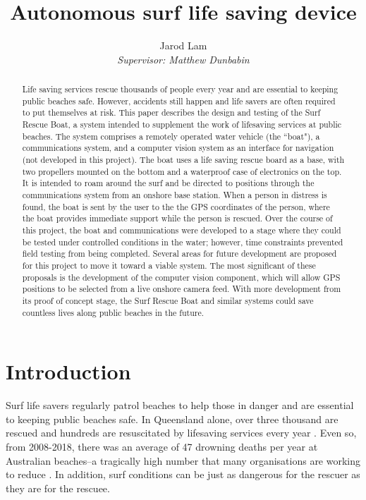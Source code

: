 \documentclass[a4paper]{IEEEtran}
\title{\vspace{5.0cm}Autonomous surf life saving device}
\author{\Large Jarod Lam\\ \textit{Supervisor: Matthew Dunbabin}}
\begin{document}
\begin{minipage}{\textwidth}
\vfill
\maketitle
\vfill
\end{minipage}
\clearpage

\begin{abstract}
Life saving services rescue thousands of people every year and are essential to keeping public beaches safe. However, accidents still happen and life savers are often required to put themselves at risk. This paper describes the design and testing of the Surf Rescue Boat, a system intended to supplement the work of lifesaving services at public beaches. The system comprises a remotely operated water vehicle (the ``boat"), a communications system, and a computer vision system as an interface for navigation (not developed in this project). The boat uses a life saving rescue board as a base, with two propellers mounted on the bottom and a waterproof case of electronics on the top. It is intended to roam around the surf and be directed to positions through the communications system from an onshore base station. When a person in distress is found, the boat is sent by the user to the the GPS coordinates of the person, where the boat provides immediate support while the person is rescued. Over the course of this project, the boat and communications were developed to a stage where they could be tested under controlled conditions in the water; however, time constraints prevented field testing from being completed. Several areas for future development are proposed for this project to move it toward a viable system. The most significant of these proposals is the development of the computer vision component, which will allow GPS positions to be selected from a live onshore camera feed. With more development from its proof of concept stage, the Surf Rescue Boat and similar systems could save countless lives along public beaches in the future.
\end{abstract}

\setcounter{tocdepth}{2}
\tableofcontents

\section{Introduction}
Surf life savers regularly patrol beaches to help those in danger and are essential to keeping public beaches safe. In Queensland alone, over three thousand are rescued and hundreds are resuscitated by lifesaving services every year \cite{lifesaving}. Even so, from 2008-2018, there was an average of 47 drowning deaths per year at Australian beaches--a tragically high number that many organisations are working to reduce \cite{drowning}. In addition, surf conditions can be just as dangerous for the rescuer as they are for the rescuee.
\end{document}

